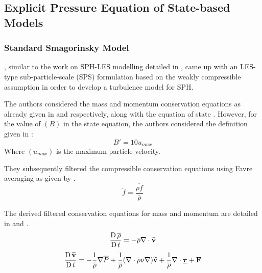 \subsection{Explicit Pressure Equation of State-based Models}
\subsubsection{Standard Smagorinsky Model}

\cite{ROGERS2005}, similar to the work on SPH-LES modelling detailed in , came up with an LES-type sub-particle-scale (SPS) formulation based on the weakly compressible assumption in order to develop a turbulence model for SPH.

The authors considered the mass and momentum conservation equations as already given in  and   respectively, along with the equation of state . However, for the value of $(B)$ in the state equation, the authors considered the definition given in :
\begin{equation}
    B' = 10 u_{max}
    \label{eq:ROGERS2005-eos-b}
\end{equation}
Where $(u_{max})$ is the maximum particle velocity.

They subsequently filtered the compressible conservation equations using Favre averaging as given by .
\begin{equation}
    \widetilde{f} = \frac{\overline{\rho f}}{\overline{\rho}}
    \label{eq:ROGERS2005-favre-averaging}
\end{equation}


The derived filtered conservation equations for mass and momentum are detailed in  and .
\begin{equation}
    \frac{\operatorname{D} \overline{\rho}}{\operatorname{D} t} = -\overline{\rho} \nabla \cdot \mathbf{\widetilde{v}}
    \label{eq:ROGERS2005-continuity-filtered}
\end{equation}
\begin{equation}
    \frac{\operatorname{D} \mathbf{\widetilde{v}}}{\operatorname{D} t} = - \frac{1}{\overline{\rho}}\nabla \overline{P} + \frac{1}{\overline{\rho}} (\nabla \cdot \overline{\rho \nu} \nabla) \mathbf{\widetilde{v}} + \frac{1}{\overline{\rho}}\nabla\cdot\underline{\bm{\tau}} + \mathbf{F}
    \label{eq:ROGERS2005-mom-filtered}
\end{equation}

